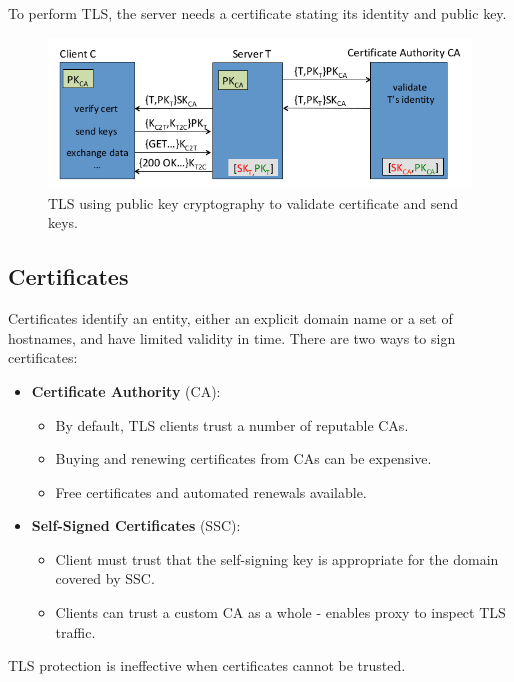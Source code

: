 \documentclass[11pt]{article}
\begin{document}
To perform TLS, the server needs a certificate stating its identity and public key.

\begin{figure}[htb!]
  \centering
  \caption{TLS using public key cryptography to validate certificate and send keys.}
  \includegraphics[scale=0.5]{tls}
\end{figure}

\subsection{Certificates}
Certificates identify an entity, either an explicit domain name or a set of hostnames, and have limited validity in time.
There are two ways to sign certificates:
\begin{itemize}
  \item \textbf{Certificate Authority} (CA):
    \begin{itemize}
      \item By default, TLS clients trust a number of reputable CAs.
      \item Buying and renewing certificates from CAs can be expensive.
      \item Free certificates and automated renewals available.
    \end{itemize}
  \item \textbf{Self-Signed Certificates} (SSC):
    \begin{itemize}
      \item Client must trust that the self-signing key is appropriate for the domain covered by SSC.
      \item Clients can trust a custom CA as a whole - enables proxy to inspect TLS traffic.
    \end{itemize}
\end{itemize}
TLS protection is ineffective when certificates cannot be trusted.
\end{document}
